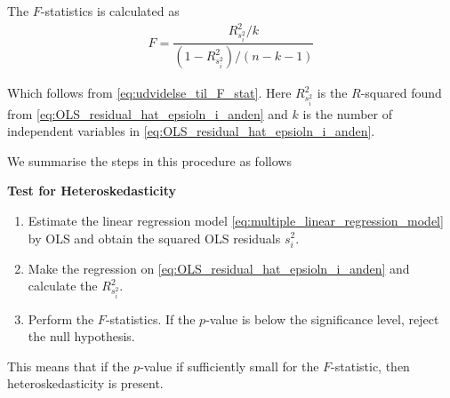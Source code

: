 The $F$-statistics is calculated as
\begin{align*}
    F = \dfrac{R^2_{s_i^2}/k}{(1-R^2_{s_i^2}) / (n-k-1)}
\end{align*}

Which follows from \eqref{eq:udvidelse_til_F_stat}.
Here $R^2_{s_i^2}$ is the $R$-squared found from \eqref{eq:OLS_residual_hat_epsioln_i_anden} and $k$ is the number of independent variables in \eqref{eq:OLS_residual_hat_epsioln_i_anden}. 

We summarise the steps in this procedure as follows

\textbf{Test for Heteroskedasticity}
\begin{enumerate}[label=(\roman*)]
    \item Estimate the linear regression model \eqref{eq:multiple_linear_regression_model} by OLS and obtain the squared OLS residuals $s_i^2$. 
    \item Make the regression on \eqref{eq:OLS_residual_hat_epsioln_i_anden} and calculate the $R^2_{s_i^2}$. 
    \item Perform the $F$-statistics. If the $p$-value is below the significance level, reject the null hypothesis. 
\end{enumerate}

This means that if the $p$-value if sufficiently small for the $F$-statistic, then heteroskedasticity is present. 













